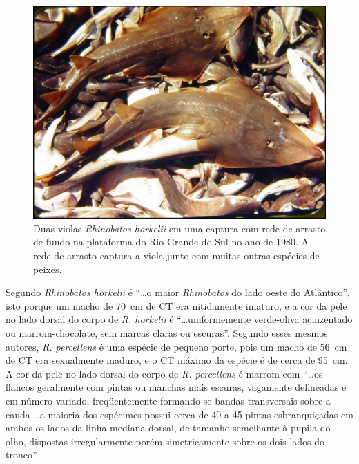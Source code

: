 \documentclass[a4paper,11pt,twoside,showtrims,onecolumn,openright,final]{memoir}
\begin{document}
\begin{figure}
\begin{center}
\includegraphics[width=\textwidth]{VIOLAS_NOARRASTO}
\end{center}
\caption[Duas violas \emph{Rhinobatos horkelii} em uma captura com rede de arrasto de fundo 
         na plataforma do Rio Grande do Sul no ano de 1980.]
	{Duas violas \emph{Rhinobatos horkelii} em uma captura com rede de arrasto de fundo 
         na plataforma do Rio Grande do Sul no ano de 1980. 
	 A rede de arrasto captura a viola junto com muitas outras espécies de peixes.}
\label{fig:violas-noarrasto}
\end{figure}


Segundo \citet[p. 56--71, tradução pelos autores]{bigelow1953} %
\emph{Rhinobatos horkelii} é ``\ldots o maior \emph{Rhinobatos} do lado oeste do Atlântico'', 
isto porque um macho de 70~cm de CT era nitidamente imaturo, e a cor da pele 
no lado dorsal do corpo de \emph{R. horkelii} é ``\ldots uniformemente verde-oliva acinzentado 
ou marrom-chocolate, sem marcas claras ou escuras''. Segundo esses mesmos autores, 
\emph{R. percellens} é uma espécie de pequeno porte, pois um macho de 56~cm de CT 
era sexualmente maduro, e o CT máximo da espécie é de cerca de 95~cm. A cor da 
pele no lado dorsal do corpo de \emph{R. percellens} é marrom com ``\ldots os flancos geralmente 
com pintas ou manchas mais escuras, vagamente delineadas e em número variado, 
freqüentemente formando-se bandas transversais sobre a cauda  \ldots a maioria dos 
espécimes possui cerca de 40 a 45 pintas esbranquiçadas em ambos os lados da 
linha mediana dorsal, de tamanho semelhante à pupila do olho, dispostas 
irregularmente porém simetricamente sobre os dois lados do tronco''.   
\end{document}
